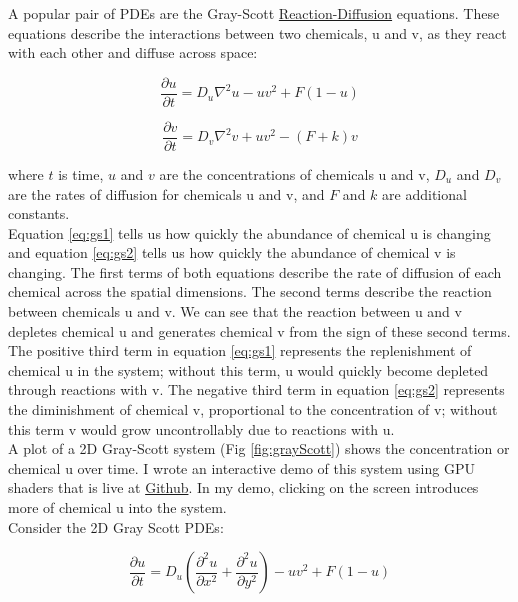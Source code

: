 {A popular pair of PDEs are the Gray-Scott \href{https://en.wikipedia.org/wiki/Reaction%E2%80%93diffusion_system#Two-component_reaction.E2.80.93diffusion_equations}{Reaction-Diffusion} equations.  These equations describe the interactions between two chemicals, u and v, as they react with each other and diffuse across space:

 \begin{equation}\label{eq:gs1}
  \frac{\partial u}{\partial t} = D_{u}\nabla^{2} u -uv^{2} + F(1-u)
  \end{equation}
  
   \begin{equation}\label{eq:gs2}
  \frac{\partial v}{\partial t} = D_{v}\nabla^{2} v +uv^{2} - (F+k)v
  \end{equation}
  
  where $t$ is time, $u$ and $v$ are the concentrations of chemicals u and v, $D_{u}$ and $D_{v}$ are the rates of diffusion for chemicals u and v, and $F$ and $k$ are additional constants.  \\
  
  Equation \ref{eq:gs1} tells us how quickly the abundance of chemical u is changing and equation \ref{eq:gs2} tells us how quickly the abundance of chemical v is changing.  The first terms of both equations describe the rate of diffusion of each chemical across the spatial dimensions.  The second terms describe the reaction between chemicals u and v.  We can see that the reaction between u and v depletes chemical u and generates chemical v from the sign of these second terms.  The positive third term in equation \ref{eq:gs1} represents the replenishment of chemical u in the system; without this term, u would quickly become depleted through reactions with v.  The negative third term in equation \ref{eq:gs2} represents the diminishment of chemical v, proportional to the concentration of v; without this term v would grow uncontrollably due to reactions with u.\\
  
  A plot of a 2D Gray-Scott system (Fig \ref{fig:grayScott}) shows the concentration or chemical u over time.  I wrote an interactive demo of this system using GPU shaders that is live at  \href{http://git.amandaghassaei.com/ReactionDiffusionShader/}{Github}.  In my demo, clicking on the screen introduces more of chemical u into the system.\\
  
  Consider the 2D Gray Scott PDEs:
  
   \begin{equation}
  \frac{\partial u}{\partial t} = D_{u}\left(\frac{\partial^{2} u}{\partial x^{2}}+\frac{\partial^{2} u}{\partial y^{2}} \right) -uv^{2} + F(1-u)
  \end{equation}
  
}
